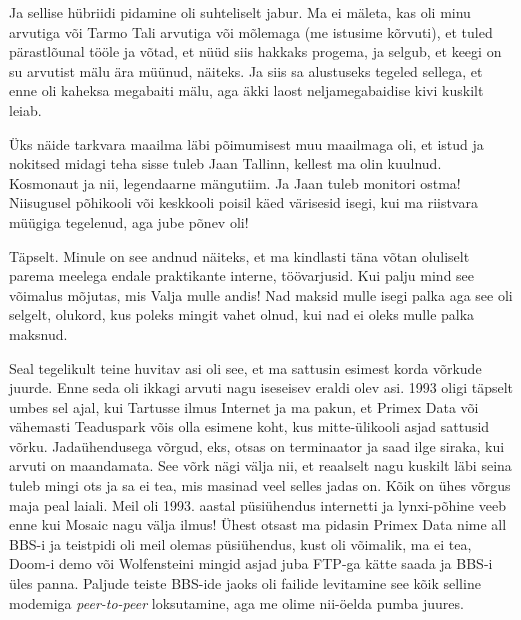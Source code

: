 Ja sellise hübriidi  pidamine oli suhteliselt jabur. Ma ei mäleta, kas oli minu arvutiga või Tarmo Tali arvutiga või mõlemaga (me istusime kõrvuti), et tuled pärastlõunal tööle ja võtad, et nüüd siis hakkaks progema, ja selgub, et keegi on su arvutist mälu ära müünud, näiteks. Ja siis sa  alustuseks tegeled sellega, et enne oli kaheksa megabaiti mälu, aga äkki laost neljamegabaidise kivi kuskilt leiab. 

Üks näide tarkvara maailma läbi põimumisest muu maailmaga oli, et istud ja nokitsed midagi teha sisse tuleb  Jaan Tallinn, kellest ma olin kuulnud. Kosmonaut ja nii, legendaarne mängutiim. Ja Jaan tuleb monitori ostma! Niisugusel põhikooli või keskkooli poisil käed värisesid isegi, kui ma riistvara müügiga tegelenud, aga jube põnev oli!


Täpselt. Minule on see andnud näiteks, et ma kindlasti täna võtan oluliselt parema meelega endale praktikante interne, töövarjusid. Kui palju mind see võimalus mõjutas, mis Valja  mulle andis! Nad maksid mulle isegi palka aga see oli selgelt, olukord, kus poleks mingit vahet olnud, kui nad ei oleks mulle palka maksnud.

Seal tegelikult teine huvitav asi oli see, et ma sattusin esimest korda võrkude juurde. Enne seda oli ikkagi arvuti nagu iseseisev eraldi olev asi. 1993 oligi täpselt umbes sel ajal, kui Tartusse ilmus Internet ja ma pakun, et Primex Data või vähemasti Teaduspark võis olla esimene koht, kus mitte-ülikooli asjad sattusid võrku. Jadaühendusega võrgud, eks, otsas on terminaator ja saad ilge siraka, kui arvuti on maandamata. See võrk nägi välja nii, et reaalselt nagu kuskilt läbi seina tuleb mingi ots ja sa ei tea, mis masinad veel selles jadas on. Kõik on ühes võrgus maja peal laiali. Meil oli 1993. aastal  püsiühendus internetti ja lynxi-põhine veeb enne kui Mosaic nagu välja ilmus! Ühest otsast ma pidasin Primex Data nime all BBS-i ja teistpidi oli meil olemas püsiühendus, kust oli võimalik, ma ei tea, Doom-i demo või Wolfensteini mingid asjad juba FTP-ga kätte saada ja BBS-i üles panna. Paljude teiste BBS-ide jaoks oli failide levitamine see kõik selline modemiga \emph{peer-to-peer} loksutamine, aga me olime nii-öelda pumba juures. 

